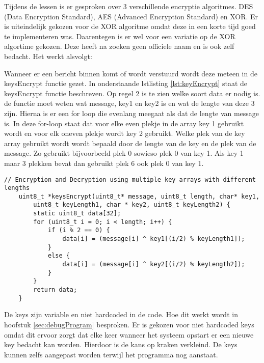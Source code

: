 Tijdens de lessen is er gesproken over 3 verschillende encryptie algoritmes. DES (Data Encryption Standard), AES (Advanced Encryption Standard)
en XOR. Er is uiteindelijk gekozen voor de XOR algoritme omdat deze in een korte tijd goed te implementeren was. Daarentegen is er wel voor
een variatie op de XOR algortime gekozen. Deze heeft na zoeken geen officiele naam en is ook zelf bedacht.
Het werkt alsvolgt:

Wanneer er een bericht binnen komt of wordt verstuurd wordt deze meteen in de keysEncrypt functie gezet. In onderstaande lstlisting \ref{lst:keyEncrypt} 
staat  de keysEncrypt functie beschreven. Op regel 2 is te zien welke soort data er nodig is. de functie moet weten wat message, key1 en
key2 is en wat de lengte van deze 3 zijn. Hierna is er een for loop die evenlang meegaat als dat de lengte van message is. In deze 
for-loop staat dat voor elke even plekje in de array key 1 gebruikt wordt en voor elk oneven plekje wordt key 2 gebruikt. Welke plek 
van de key array gebruikt wordt wordt bepaald door de lengte van de key en de plek van de message. Zo gebruikt bijvoorbeeld plek 0 
sowieso plek 0 van key 1. Als key 1 maar 3 plekken bevat dan gebruikt plek 6 ook plek 0 van key 1. 

\begin{lstlisting}[caption={keyEncrypt Functie},captionpos=b,label={lst:keyEncrypt},style=c,xleftmargin=.\textwidth,xrightmargin=.\textwidth]
    // Encryption and Decryption using multiple key arrays with different lengths
    uint8_t *keysEncrypt(uint8_t* message, uint8_t length, char* key1, 
        uint8_t keyLength1, char * key2, uint8_t keyLength2) {
        static uint8_t data[32];
        for (uint8_t i = 0; i < length; i++) {
            if (i % 2 == 0) {  
                data[i] = (message[i] ^ key1[(i/2) % keyLength1]);
            }
            else {
                data[i] = (message[i] ^ key2[(i/2) % keyLength2]);
            }
        }
        return data;
    }
\end{lstlisting}

De keys zijn variable en niet hardcoded in de code. Hoe dit werkt wordt in hoofstuk \ref{sec:debugProgram} besproken. 
Er is gekozen voor niet hardcoded keys omdat dit ervoor zorgt dat elke keer wanneer het systeem opstart er een nieuwe key bedacht 
kan worden. Hierdoor is de kans op kraken verkleind. De keys kunnen zelfs aangepast worden terwijl het programma nog aanstaat.         